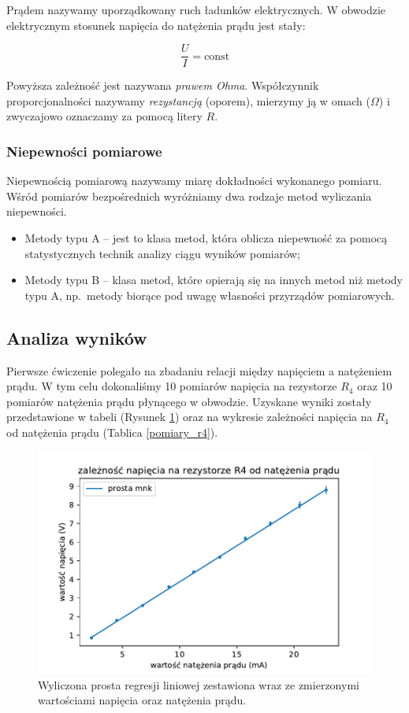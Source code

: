 \documentclass[a4paper]{article}
\newlength{\du}
\begin{document}
Prądem nazywamy uporządkowany ruch ładunków elektrycznych.
W obwodzie elektrycznym stosunek napięcia do natężenia prądu jest stały:

$$\frac{U}{I} = \text{const}$$

Powyższa zależność jest nazywana \emph{prawem Ohma}. Współczynnik proporcjonalności nazywamy \emph{rezystancją} (oporem), mierzymy ją w omach ($\Omega$) i zwyczajowo oznaczamy za pomocą litery $R$.

\subsubsection{Niepewności pomiarowe}

Niepewnością pomiarową nazywamy miarę dokładności wykonanego pomiaru.
Wśród pomiarów bezpośrednich wyróżniamy dwa rodzaje metod wyliczania niepewności.

\begin{itemize}
\item Metody typu A -- jest to klasa metod, która oblicza niepewność za pomocą statystycznych technik analizy ciągu 	wyników pomiarów;
\item Metody typu B -- klasa metod, które opierają się na innych metod niż metody typu A, np.~metody biorące pod uwagę własności przyrządów pomiarowych.
\end{itemize}

\subsection{Analiza wyników}

Pierwsze ćwiczenie polegało na zbadaniu relacji między napięciem a natężeniem prądu.
W tym celu dokonaliśmy 10 pomiarów napięcia na rezystorze $R_4$ oraz 10 pomiarów natężenia prądu płynącego w obwodzie.
Uzyskane wyniki zostały przedstawione w tabeli (Rysunek \ref{wykres}) oraz na wykresie zależności napięcia na $R_4$ od natężenia prądu (Tablica \ref{pomiary_r4}).

\begin{figure}[h]
\centering
\includegraphics[scale=0.7]{fig_d.pdf}
\caption{Wyliczona prosta regresji liniowej zestawiona wraz ze zmierzonymi wartościami napięcia oraz natężenia prądu.}
\label{wykres}
\end{figure}
\end{document}
